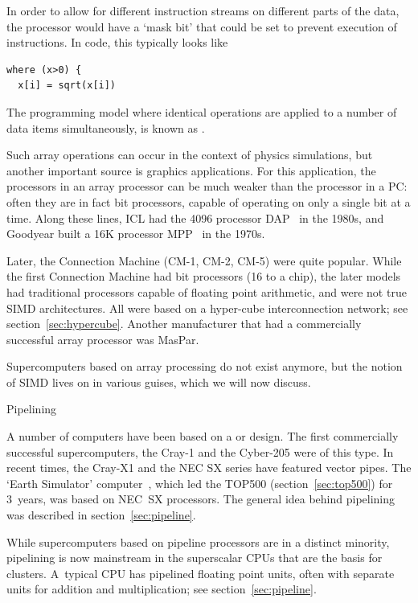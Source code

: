In order to allow for different instruction streams on
different parts of the data, the processor would have a `mask bit'
that could be set to prevent execution of instructions. In code, this 
typically looks like
\begin{verbatim}
where (x>0) {
  x[i] = sqrt(x[i])
\end{verbatim}
The programming model where identical operations are applied to a
number of data items simultaneously, is known as
.

Such array operations  can occur in the context of physics simulations, but
another important source is graphics applications. For this application,
the processors in an array processor can be much weaker than the
processor in a PC: often they are in fact bit processors, capable of
operating on only a single bit at a time. Along these lines, ICL
had the 4096 processor DAP~\cite{DAP:79a} in the 1980s, and Goodyear
built a 16K processor MPP~\cite{Batcher:85a} in the 1970s.

Later, the Connection Machine (CM-1, CM-2, CM-5) were quite popular.
While the first Connection Machine had bit processors (16 to a chip),
the later models had traditional processors capable of floating point
arithmetic, and were not true SIMD architectures. All were based on a
hyper-cube interconnection network; see section~\ref{sec:hypercube}. Another
manufacturer that had a commercially successful array processor was
MasPar.

Supercomputers based on array processing do not exist anymore, but the
notion of SIMD lives on in various guises, which we will now discuss.

 {Pipelining}
\label{sec:vector}

A number of computers have been based on a  or  design. The first
commercially successful supercomputers, the Cray-1 and the Cyber-205
were of this type. In recent times, the Cray-X1 and the NEC SX series
have featured vector pipes. The `Earth Simulator'
computer~\cite{Sato2004}, which led the TOP500
(section~\ref{sec:top500}) for 3~years, was based on NEC~SX
processors.  The general idea behind pipelining was described in
section~\ref{sec:pipeline}.

While supercomputers based on pipeline processors are in a distinct
minority, pipelining is now mainstream in the superscalar CPUs that
are the basis for clusters. A~typical CPU has pipelined floating point
units, often with separate units for addition and multiplication; see
section~\ref{sec:pipeline}.

